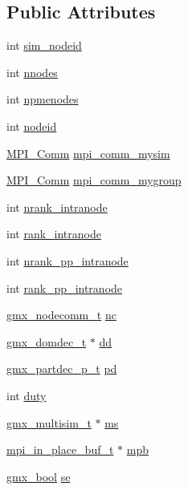 \subsection*{\-Public \-Attributes}
\begin{DoxyCompactItemize}
\item 
int \hyperlink{structt__commrec_ac159a424e70dfae0296619806be96890}{sim\-\_\-nodeid}
\item 
int \hyperlink{structt__commrec_a5652037a66d629917468e52590569f4a}{nnodes}
\item 
int \hyperlink{structt__commrec_a64d6885e7ad4cbac0176279c86f46468}{npmenodes}
\item 
int \hyperlink{structt__commrec_a8d4d07b871faa80676a45d761e263faf}{nodeid}
\item 
\hyperlink{include_2thread__mpi_2mpi__bindings_8h_a3880364558bd42f832e48ed33e6fafbb}{\-M\-P\-I\-\_\-\-Comm} \hyperlink{structt__commrec_a1fcec597442c2ef491b3727aaac4074b}{mpi\-\_\-comm\-\_\-mysim}
\item 
\hyperlink{include_2thread__mpi_2mpi__bindings_8h_a3880364558bd42f832e48ed33e6fafbb}{\-M\-P\-I\-\_\-\-Comm} \hyperlink{structt__commrec_a646b92f6a02150acd219ef44f20fff41}{mpi\-\_\-comm\-\_\-mygroup}
\item 
int \hyperlink{structt__commrec_ab298f86d18b43e4a7607a47fc8f06f7d}{nrank\-\_\-intranode}
\item 
int \hyperlink{structt__commrec_ae351f5e06f3dc3f95c90cb3676421729}{rank\-\_\-intranode}
\item 
int \hyperlink{structt__commrec_a90dc160a906cc1890b45d0dbcdd69190}{nrank\-\_\-pp\-\_\-intranode}
\item 
int \hyperlink{structt__commrec_ad2406e574e81b65a1e57870a4e7d81d4}{rank\-\_\-pp\-\_\-intranode}
\item 
\hyperlink{structgmx__nodecomm__t}{gmx\-\_\-nodecomm\-\_\-t} \hyperlink{structt__commrec_a8c742622afa442394c85553aa57ce869}{nc}
\item 
\hyperlink{structgmx__domdec__t}{gmx\-\_\-domdec\-\_\-t} $\ast$ \hyperlink{structt__commrec_a0f63c52fa221b3911a3ddeca6e403c7b}{dd}
\item 
\hyperlink{include_2types_2commrec_8h_a5aa2535d16364adabce4fd514f120892}{gmx\-\_\-partdec\-\_\-p\-\_\-t} \hyperlink{structt__commrec_a431b06468a1a71f1b59f39e7ea740ffa}{pd}
\item 
int \hyperlink{structt__commrec_a0b6d84d1dbb49e7b8d3c130dd1e14aed}{duty}
\item 
\hyperlink{structgmx__multisim__t}{gmx\-\_\-multisim\-\_\-t} $\ast$ \hyperlink{structt__commrec_a7b0caf7ffb2910c5de0357f2c05e00e9}{ms}
\item 
\hyperlink{structmpi__in__place__buf__t}{mpi\-\_\-in\-\_\-place\-\_\-buf\-\_\-t} $\ast$ \hyperlink{structt__commrec_a482d497cbce5f9560a13fa46ed393127}{mpb}
\item 
\hyperlink{include_2types_2simple_8h_a8fddad319f226e856400d190198d5151}{gmx\-\_\-bool} \hyperlink{structt__commrec_a522fec58c824083ccf2f585c7b229fcc}{se}
\end{DoxyCompactItemize}


